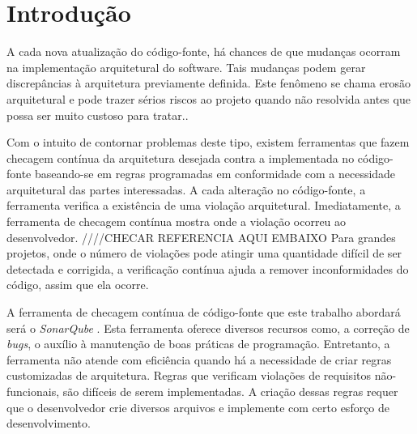 \documentclass[12pt]{report} %
\begin{document}
	\listoftables
		
	\pagebreak
	
	
	\printterms[database=acronym,columns=1,prelocation=hfill,style=align]
	
	\label{lastpretextualpage}
	\pagebreak
	
	
	\justifying
	
\chapter{Introdução}
\label{sec:introducao}
A cada nova atualização do código-fonte, há chances de que mudanças ocorram na implementação arquitetural do software. Tais mudanças podem gerar discrepâncias à arquitetura previamente definida\citep{Perry:1992:FSS:141874.141884}. Este fenômeno se chama erosão arquitetural e pode trazer sérios riscos ao projeto quando não resolvida antes que possa ser muito custoso para tratar.\citep{Foote99bigball}.

Com o intuito de contornar problemas deste tipo, existem ferramentas que fazem checagem contínua da arquitetura desejada contra a implementada no código-fonte baseando-se em regras programadas em conformidade com a necessidade arquitetural das partes interessadas. A cada alteração no código-fonte, a ferramenta verifica a existência de uma violação arquitetural. Imediatamente, a ferramenta de checagem contínua mostra onde a violação ocorreu ao desenvolvedor. 
////CHECAR REFERENCIA AQUI EMBAIXO
Para grandes projetos, onde o número de violações pode atingir uma quantidade difícil de ser detectada e corrigida, a verificação contínua ajuda a remover inconformidades do código, assim que ela ocorre\citep{goldstein_automatic_2015}.

A ferramenta de checagem contínua de código-fonte que este trabalho abordará será o \textit{SonarQube} \citet{sonar_qube}. Esta ferramenta oferece diversos recursos como, a correção de \textit{bugs}, o auxílio à manutenção de boas práticas de programação. Entretanto, a ferramenta não atende com eficiência quando há a necessidade de criar regras customizadas de arquitetura. Regras que verificam violações de requisitos não-funcionais, são difíceis de serem implementadas. A criação dessas regras requer que o desenvolvedor crie diversos arquivos e implemente com certo esforço de desenvolvimento. 
\end{document}
